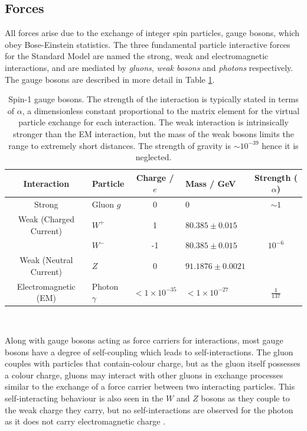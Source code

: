 	\newpage
	\subsection{Forces}

		All forces arise due to the exchange of integer spin particles, gauge bosons, which obey Bose-Einstein statistics. The three fundamental particle interactive forces for the Standard Model are named the strong, weak and electromagnetic interactions, and are mediated by \textit{gluons}, \textit{weak bosons} and \textit{photons} respectively. The gauge bosons are described in more detail in Table \ref{t:tab:boson}.

		\begin{table}[ht]
			\caption[Properties of Spin-$1$ gauge bosons]{Spin-1 gauge bosons. The strength of the interaction is typically stated in terms of $\alpha$, a dimensionless constant proportional to the matrix element for the virtual particle exchange for each interaction. The weak interaction is intrinsically stronger than the EM interaction, but the mass of the weak bosons limits the range to extremely short distances.  The strength of gravity is $\sim10^{-39}$ hence it is neglected. \cite{pdg}}
			\label{t:tab:boson}
			\medskip
			\centering
			\begin{tabular}{clclc}\toprule
				Interaction & Particle & Charge / $e$ & Mass / GeV & Strength ($\alpha$) \\\midrule
				Strong    &     Gluon $g$      & 0 & 0 & $\sim1$\\
				Weak (Charged Current)&     $W^+$    &    1   & $80.385\pm0.015$ & \\
				&     $W^-$    &    -1   & $80.385\pm0.015$ & $10^{-6}$ \\
				Weak (Neutral Current)&     $Z$   &    0   & $91.1876\pm0.0021$ & \\
				Electromagnetic (EM)   &     Photon $\gamma$  &  $<1\times10^{-35}$   & $<1\times10^{-27}$ & $\frac{1}{137}$\\\bottomrule
			\end{tabular}\\[5pt]
		\end{table}

		Along with gauge bosons acting as force carriers for interactions, most gauge bosons have a degree of self-coupling which leads to self-interactions. The gluon couples with particles that contain-colour charge, but as the gluon itself possesses a colour charge, gluons may interact with other gluons in exchange processes similar to the exchange of a force carrier between two interacting particles. This self-interacting behaviour is also seen in the $W$ and $Z$ bosons as they couple to the weak charge they carry, but no self-interactions are observed for the photon as it does not carry electromagnetic charge \cite{martinshaw}.

